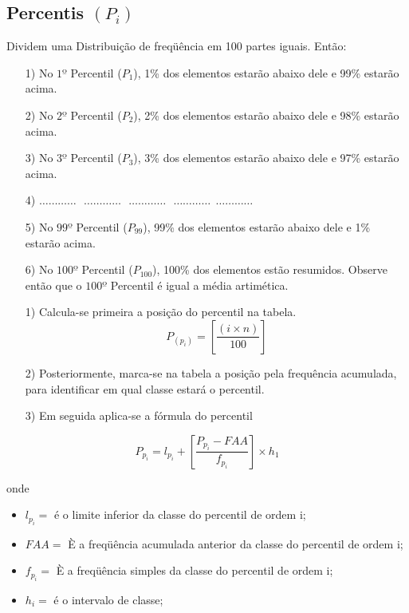\subsection{Percentis $(P_{i})$}

Dividem uma Distribuição de freqüência em 100 partes iguais. Então:


\begin{enumerate}
  \item[{1)}] No $1º$ Percentil ($P_{1}$), 1\% dos elementos estarão abaixo dele e 99\% estarão acima.
  \item[{2)}] No $2º$ Percentil ($P_{2}$), 2\% dos elementos estarão abaixo dele e 98\% estarão acima.
  \item[{3)}] No $3º$ Percentil ($P_{3}$), 3\% dos elementos estarão abaixo dele e 97\% estarão acima.
   \item[{4)}] $\ldots \ldots \ldots \ldots \ \ \  \ldots \ldots \ldots \ldots \ \ \  \ldots \ldots \ldots \ldots \ \ \  \ldots \ldots \ldots \ldots \ \ \ldots \ldots \ldots \ldots$
  \item[{5)}] No $99º$ Percentil ($P_{99}$), 99\% dos elementos estarão abaixo dele e 1\% estarão acima.
   \item[{6)}] No $100º$ Percentil ($P_{100}$), 100\% dos elementos estão resumidos. Observe então que o $100º$ Percentil é igual a média artimética.
\end{enumerate}



\begin{enumerate}
\item [{1)}]Calcula-se primeira a posição do percentil na tabela.
$$ P_{(p_{i})} = \left[ \frac{(i \times n)}{100} \right] $$
\item [{2)}] Posteriormente, marca-se na tabela a posição pela frequência acumulada, para identificar em qual classe estará o percentil.
\item [{3)}] Em seguida aplica-se a fórmula do percentil
\end{enumerate}

\begin{equation}\label{}
    P_{p_{i}}= l_{p_{i}}+\left[\frac{P_{p_{i}}-FAA}{f_{p_{i}}}\right]\times h_{1}
\end{equation}

 onde

 \begin{itemize}
   \item $l_{p_{i}}=$ é o limite inferior da classe do percentil de ordem i;
   \item $FAA=$ È a freqüência acumulada anterior da classe do percentil de ordem i;
   \item $f_{p_{i}}=$ È a freqüência simples da classe do percentil de ordem i;
   \item $h_{i}=$ é o intervalo de classe;
 \end{itemize}



